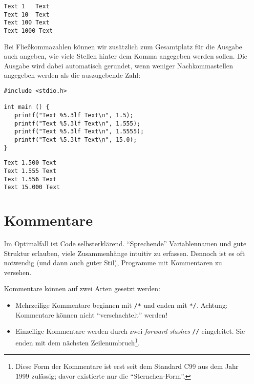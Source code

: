 \begin{cmdbox}
\begin{verbatim}
Text 1   Text
Text 10  Text
Text 100 Text
Text 1000 Text
\end{verbatim}
\end{cmdbox}

Bei Fließkommazahlen können wir zusätzlich zum Gesamtplatz für die Ausgabe auch angeben, wie viele Stellen hinter dem Komma angegeben werden sollen. Die Ausgabe wird dabei automatisch gerundet, wenn weniger Nachkommastellen angegeben werden als die auszugebende Zahl:

\begin{codebox}
\begin{verbatim}
#include <stdio.h>

int main () {
   printf("Text %5.3lf Text\n", 1.5);
   printf("Text %5.3lf Text\n", 1.555);
   printf("Text %5.3lf Text\n", 1.5555);
   printf("Text %5.3lf Text\n", 15.0);
}
\end{verbatim}
\end{codebox}

\begin{cmdbox}
\begin{verbatim}
Text 1.500 Text
Text 1.555 Text
Text 1.556 Text
Text 15.000 Text
\end{verbatim}
\end{cmdbox}

\section{Kommentare}
Im Optimalfall ist Code selbsterklärend. \enquote{Sprechende} Variablennamen und gute Struktur erlauben, viele Zusammenhänge intuitiv zu erfassen. Dennoch ist es oft notwendig (und dann auch guter Stil), Programme mit Kommentaren zu versehen.

Kommentare können auf zwei Arten gesetzt werden:
\begin{itemize}
\item Mehrzeilige Kommentare beginnen mit \texttt{/*} und enden mit \texttt{*/}. Achtung: Kommentare können nicht \enquote{verschachtelt} werden!
\item Einzeilige Kommentare werden durch zwei \emph{forward slashes} \texttt{//} eingeleitet. Sie enden mit dem nächsten Zeilenumbruch\footnote{Diese Form der Kommentare ist erst seit dem Standard C99 aus dem Jahr 1999 zulässig; davor existierte nur die \enquote{Sternchen-Form}.}.
\end{itemize}

